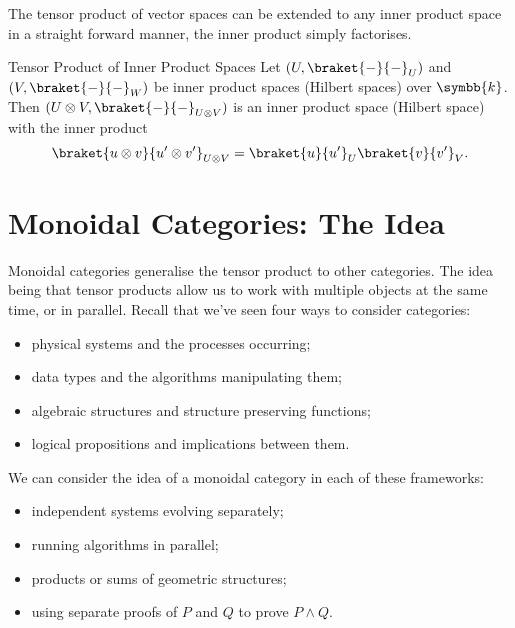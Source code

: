 \documentclass[fleqn]{NotesClass}
\renewcommand{\field}{\symbb{k}}
\begin{document}
    The tensor product of vector spaces can be extended to any inner product space in a straight forward manner, the inner product simply factorises.
    
    \begin{dfn}{Tensor Product of Inner Product Spaces}{}
        Let \((U, \braket{-}{-}_U)\) and \((V, \braket{-}{-}_W)\) be inner product spaces (Hilbert spaces) over \(\field\).
        Then \((U \otimes V, \braket{-}{-}_{U \otimes V})\) is an inner product space (Hilbert space) with the inner product
        \begin{equation}
            \braket{u \otimes v}{u' \otimes v'}_{U \otimes V} = \braket{u}{u'}_U \braket{v}{v'}_V.
        \end{equation}
    \end{dfn}
    
    \section{Monoidal Categories: The Idea}
    Monoidal categories generalise the tensor product to other categories.
    The idea being that tensor products allow us to work with multiple objects at the same time, or in parallel.
    Recall that we've seen four ways to consider categories:
    \begin{itemize}
        \item physical systems and the processes occurring;
        \item data types and the algorithms manipulating them;
        \item algebraic structures and structure preserving functions;
        \item logical propositions and implications between them.
    \end{itemize}
    We can consider the idea of a monoidal category in each of these frameworks:
    \begin{itemize}
        \item independent systems evolving separately;
        \item running algorithms in parallel;
        \item products or sums of geometric structures;
        \item using separate proofs of \(P\) and \(Q\) to prove \(P \land Q\).
    \end{itemize}
    
\end{document}
